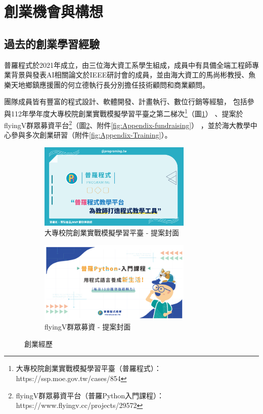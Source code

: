 \section{創業機會與構想}
\subsection{過去的創業學習經驗}

普羅程式於2021年成立，由三位海大資工系學生組成，成員中有具備全端工程師專業背景與發表AI相關論文於IEEE研討會的成員，並由海大資工的馬尚彬教授、魚樂天地鄉鎮應援團的何立德執行長分別擔任技術顧問和商業顧問。

團隊成員皆有豐富的程式設計、軟體開發、計畫執行、數位行銷等經驗，
包括參與112年學年度大專校院創業實戰模擬學習平臺之第二梯次\footnote{大專校院創業實戰模擬學習平臺（普羅程式）：https://ssp.moe.gov.tw/cases/854}（圖\ref{fig:experience-1}）
、提案於flyingV群眾募資平台\footnote{flyingV群眾募資平台（普羅Python入門課程）：https://www.flyingv.cc/projects/29572}（圖\ref{fig:experience-2}、附件\ref{fig:Appendix-fundraising}）
，並於海大教學中心參與多次創業研習（附件\ref{fig:Appendix-Training}）。

\begin{figure}[H]
  \centering
  \begin{subfigure}{0.45\linewidth}
    \centering
    \includegraphics[width=0.8\textwidth]{images/maker.png}
    \caption{大專校院創業實戰模擬學習平臺 - 提案封面}
    \label{fig:experience-1}
  \end{subfigure}
    \begin{subfigure}{0.45\linewidth}
    \centering
    \includegraphics[width=0.8\textwidth]{images/flyingv.jpg}
    \caption{flyingV群眾募資 - 提案封面}
    \label{fig:experience-2}
  \end{subfigure}
  \caption{創業經歷}
  \label{fig:Experience}
\end{figure}

